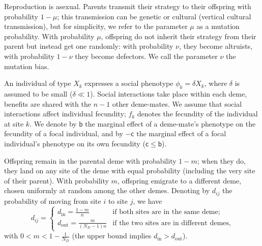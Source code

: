 \documentclass[11pt, letterpaper]{article}
\newcommand{\bigO}[1]{O\left( #1 \right)}
\newcommand{\bb}{\mathsf{b}}
\newcommand{\cc}{\mathsf{c}}
\newcommand{\mutbias}{\nu}
\newcommand{\inn}{\textrm{in}}
\newcommand{\out}{\textrm{out}}
\newcommand{\din}{d_{\inn}}
\newcommand{\dout}{d_{\out}}
\newcommand{\ndemes}{N_D}
\begin{document}
Reproduction is asexual. Parents transmit their strategy to their offspring with probability $1-\mu$; this transmission can be genetic or cultural (vertical cultural transmission), but for simplicity, we refer to the parameter $\mu$ as a mutation probability. With probability $\mu$, offspring do not inherit their strategy from their parent but instead get one randomly: with probability $\mutbias$, they become altruists, with probability $1-\mutbias$ they become defectors. We call the parameter $\mutbias$ the mutation bias. 

An individual of type $X_k$ expresses a social phenotype $\phi_k = \delta X_k$, where $\delta$ is assumed to be small ($\delta \ll 1$). Social interactions take place within each deme, benefits are shared with the $n-1$ other deme-mates. We assume that social interactions affect individual fecundity; $f_k$ denotes the fecundity of the individual at site $k$. We denote by $\bb$ the marginal effect of a deme-mate's phenotype on the fecundity of a focal individual, and by $-\cc$ the marginal effect of a focal individual's phenotype on its own fecundity ($\cc \leq \bb$). %

Offspring remain in the parental deme with probability $1-m$; when they do, they land on any site of the deme with equal probability (including the very site of their parent). With probability $m$, offspring emigrate to a different deme, chosen uniformly at random among the other demes. Denoting by $d_{ij}$ the probability of moving from site $i$ to site $j$, we have
\begin{equation}\label{eq:defD}
d_{ij} = \begin{cases}
 \din =  \frac{1-m}{n} & \textrm{if both sites are in the same deme;}\\
 \dout = \frac{m}{(\ndemes-1) n} & \textrm{if the two sites are in different demes,} 
\end{cases}
\end{equation}
%
with $0 < m < 1-\frac{1}{\ndemes}$ (the upper bound implies $\din>\dout$).
\end{document}
